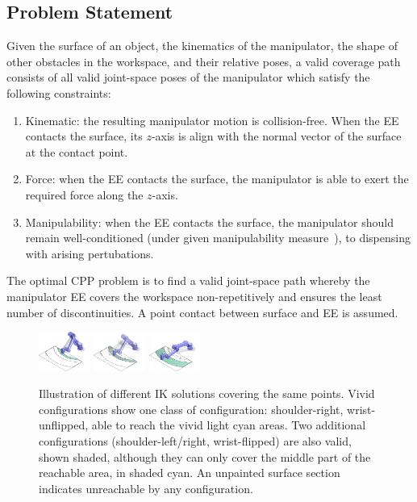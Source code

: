 \documentclass[journal]{IEEEtran}
\begin{document}
\subsection{Problem Statement}
Given the surface of an object, the kinematics of the manipulator, the shape of other obstacles in the workspace, and their relative poses, a valid coverage path consists of all valid joint-space poses of the manipulator which satisfy the following constraints:
\begin{enumerate}
\item Kinematic: the resulting manipulator motion is collision-free. When the EE contacts the surface, its $z$-axis is align with the normal vector of the surface at the contact point. 
\item Force: when the EE contacts the surface, the manipulator is able to exert the required force along the $z$-axis.  
\item Manipulability: when the EE contacts the surface, the manipulator should remain well-conditioned (under given manipulability measure~\cite{yoshikawa1990translational}), %
to dispensing with arising pertubations. %
\end{enumerate}

\noindent
The optimal CPP problem is to find a valid joint-space path whereby the manipulator EE covers the workspace non-repetitively and ensures the least number of discontinuities. A point contact between surface and EE is assumed.

\begin{figure}[t]
\centering
\includegraphics[width = 0.15\textwidth]{square_example/simple_example_merged_545}
\includegraphics[width = 0.15\textwidth]{square_example/simple_example_merged_551}
\includegraphics[width = 0.15\textwidth]{square_example/simple_example_merged_565}
\caption{Illustration of different IK solutions covering the same points. Vivid configurations show one class of configuration: shoulder-right, wrist-unflipped, able to reach the vivid light cyan areas. Two additional configurations (shoulder-left/right, wrist-flipped) are also valid, shown shaded, although they can only cover the middle part of the reachable area, in shaded cyan. An unpainted surface section indicates unreachable by any configuration.}
\label{figsquare}
\end{figure}
\end{document}
